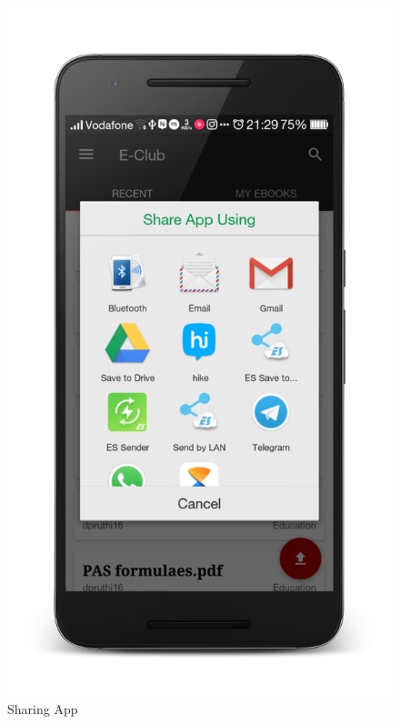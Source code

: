 \newpage
\begin{figure}[ht]
\centering
\includegraphics[scale=0.13]{images/d4.png}
\caption{Sharing App}
\end{figure}

